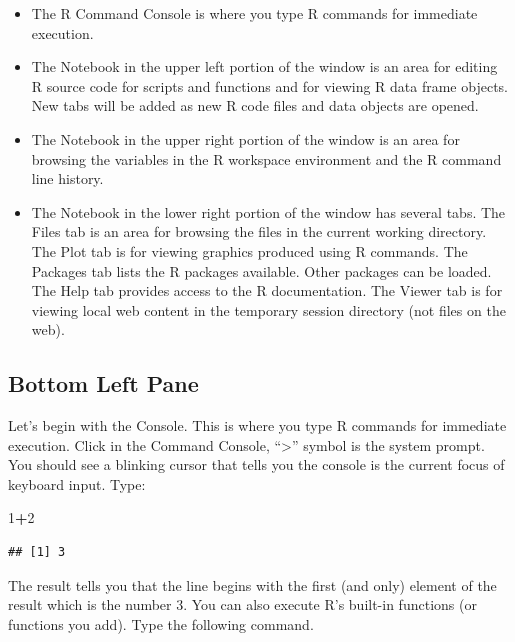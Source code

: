 \documentclass[
]{book}
\newenvironment{Shaded}{\begin{snugshade}}{\end{snugshade}}
\newcommand{\DecValTok}[1]{\textcolor[rgb]{0.00,0.00,0.81}{#1}}
\newcommand{\OperatorTok}[1]{\textcolor[rgb]{0.81,0.36,0.00}{\textbf{#1}}}
\begin{document}
\begin{itemize}
\item
  The R Command Console is where you type R commands for immediate execution.
\item
  The Notebook in the upper left portion of the window is an area for editing R source code for scripts and functions and for viewing R data frame objects. New tabs will be added as new R code files and data objects are opened.
\item
  The Notebook in the upper right portion of the window is an area for browsing the variables in the R workspace environment and the R command line history.
\item
  The Notebook in the lower right portion of the window has several tabs. The Files tab is an area for browsing the files in the current working directory. The Plot tab is for viewing graphics produced using R commands. The Packages tab lists the R packages available. Other packages can be loaded. The Help tab provides access to the R documentation. The Viewer tab is for viewing local web content in the temporary session directory (not files on the web).
\end{itemize}

\hypertarget{bottom-left-pane}{%
\subsection*{Bottom Left Pane}\label{bottom-left-pane}}

Let's begin with the Console. This is where you type R commands for immediate execution. Click in the Command Console, ``\textgreater{}'' symbol is the system prompt. You should see a blinking cursor that tells you the console is the current focus of keyboard input. Type:

\begin{Shaded}
\begin{Highlighting}[]
\DecValTok{1}\OperatorTok{+}\DecValTok{2}
\end{Highlighting}
\end{Shaded}

\begin{verbatim}
## [1] 3
\end{verbatim}

The result tells you that the line begins with the first (and only) element of the result which is the number 3. You can also execute R's built-in functions (or functions you add). Type the following command.
\end{document}
